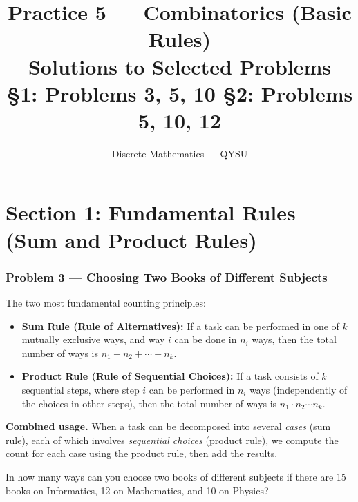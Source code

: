 \documentclass[12pt, a4paper]{article}
\title{\textbf{Practice 5 --- Combinatorics (Basic Rules)}\\[4pt]
       \large Solutions to Selected Problems\\[2pt]
       \normalsize \S1: Problems 3, 5, 10 \quad \S2: Problems 5, 10, 12}
\author{Discrete Mathematics --- QYSU}
\date{}
\begin{document}
\maketitle
\tableofcontents
\newpage

\part*{Section 1: Fundamental Rules (Sum and Product Rules)}

\section{Problem 3 --- Choosing Two Books of Different Subjects}

\begin{theorybox}
The two most fundamental counting principles:

\begin{itemize}[nosep]
  \item \textbf{Sum Rule (Rule of Alternatives):}
    If a task can be performed in one of $k$ mutually exclusive ways,
    and way $i$ can be done in $n_i$ ways, then the total number of
    ways is $n_1 + n_2 + \cdots + n_k$.

  \item \textbf{Product Rule (Rule of Sequential Choices):}
    If a task consists of $k$ sequential steps, where step $i$ can be
    performed in $n_i$ ways (independently of the choices in other steps),
    then the total number of ways is $n_1 \cdot n_2 \cdots n_k$.
\end{itemize}

\medskip
\textbf{Combined usage.}\;
When a task can be decomposed into several \emph{cases} (sum rule),
each of which involves \emph{sequential choices} (product rule),
we compute the count for each case using the product rule, then
add the results.
\end{theorybox}

\begin{problembox}
In how many ways can you choose two books of different subjects
if there are 15 books on Informatics, 12 on Mathematics, and 10 on Physics?
\end{problembox}
\end{document}
